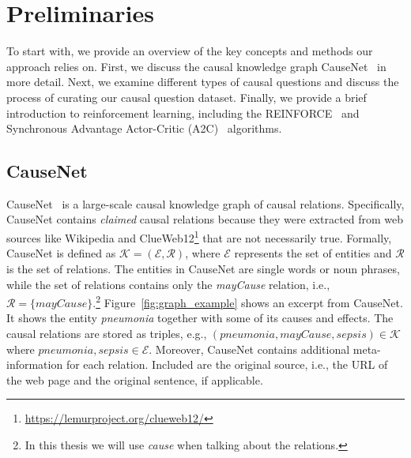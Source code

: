 %
\chapter{Preliminaries}
\label{sec:preliminaries}

To start with, we provide an overview of the key concepts and methods 
our approach relies on. 
First, we discuss the causal knowledge graph CauseNet~\cite{Heindorf2020Causenet} in more detail. 
Next, we examine different types of causal 
questions and discuss the process of curating our causal question dataset. 
Finally, we provide a brief introduction to reinforcement learning, 
including the REINFORCE~\cite{Williams1992REINFORCE} and Synchronous Advantage Actor-Critic (A2C)~\cite{Mnih2016A2C} algorithms.

\section{CauseNet}
\label{subsec:causal-kgs}
CauseNet~\cite{Heindorf2020Causenet} is a large-scale causal knowledge graph of causal relations.
Specifically, CauseNet contains \textit{claimed} causal relations because they were extracted 
from web sources like Wikipedia and ClueWeb12\footnote{\url{https://lemurproject.org/clueweb12/}} that are not necessarily true.
Formally, CauseNet is defined as $\mathcal{K} = (\mathcal{E}, \mathcal{R})$, where 
$\mathcal{E}$ represents the set of entities and $\mathcal{R}$ is the set of relations. 
The entities in CauseNet are single words or noun phrases, while the set of relations 
contains only the \textit{mayCause} relation, i.e., $\mathcal{R} = \{mayCause\}$.\footnote{In this thesis we will use \textit{cause} when talking about the relations.}
Figure~\ref{fig:graph_example} shows an excerpt from CauseNet. It shows the entity \textit{pneumonia} together 
with some of its causes and effects. The causal relations are stored as triples, e.g., 
$(pneumonia, mayCause, sepsis) \in \mathcal{K}$ where $pneumonia, sepsis \in \mathcal{E}$.
Moreover, CauseNet contains additional meta-information for each relation.
Included are the original source, i.e., the URL of the web page and the original sentence,
if applicable.

